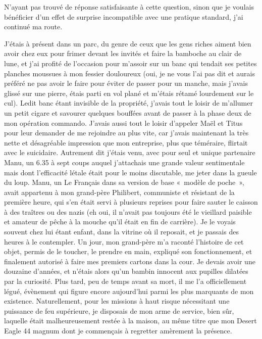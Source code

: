 N’ayant pas trouvé de réponse satisfaisante à cette question, sinon que je voulais bénéficier d’un effet de surprise incompatible avec une pratique standard, j’ai continué ma route.

J’étais à présent dans un parc, du genre de ceux que les gens riches aiment bien avoir chez eux pour frimer devant les invités et faire la bamboche au clair de lune, et j’ai profité de l’occasion pour m’assoir sur un banc qui tendait ses petites planches moussues à mon fessier douloureux (oui, je ne vous l’ai pas dit et aurais préféré ne pas avoir le faire pour éviter de passer pour un manche, mais j’avais glissé sur une pierre, étais parti en vol plané et m’étais rétamé lourdement sur le cul). Ledit banc étant invisible de la propriété, j’avais tout le loisir de m’allumer un petit cigare et savourer quelques bouffées avant de passer à la phase deux de mon opération commando. J’avais aussi tout le loisir d’appeler Maël et Titus pour leur demander de me rejoindre au plus vite, car j’avais maintenant la très nette et désagréable impression que mon entreprise, plus que téméraire, flirtait avec le suicidaire. Autrement dit j’étais venu, avec pour seul et unique partenaire Manu, un 6.35 à sept coups auquel j’attachais une grande valeur sentimentale mais dont l’efficacité létale était pour le moins discutable, me jeter dans la gueule du loup. Manu, un Le Français dans sa version de base «~modèle de poche~», avait appartenu à mon grand-père Philibert, communiste et résistant de la première heure, qui s’en était servi à plusieurs reprises pour faire sauter le caisson à des traîtres ou des nazis (eh oui, il n’avait pas toujours été le vieillard paisible et amateur de pêche à la mouche qu’il était en fin de carrière). Je le voyais souvent chez lui étant enfant, dans la vitrine où il reposait, et je passais des heures à le contempler. Un jour, mon grand-père m’a raconté l’histoire de cet objet, permis de le toucher, le prendre en main, expliqué son fonctionnement, et finalement autorisé à faire mes premiers cartons dans la cour. Je devais avoir une douzaine d’années, et n’étais alors qu’un bambin innocent aux pupilles dilatées par la curiosité. Plus tard, peu de temps avant sa mort, il me l’a officiellement légué, évènement qui figure encore aujourd’hui parmi les plus marquants de mon existence. Naturellement, pour les missions à haut risque nécessitant une puissance de feu supérieure, je disposais de mon arme de service, bien sûr, laquelle était malheureusement restée à la maison, au même titre que mon Desert Eagle 44 magnum dont je commençais à regretter amèrement la présence. 

